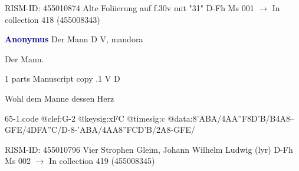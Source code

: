 \documentclass[twocolumn]{book}
\begin{document}
\newline RISM-ID: 455010874
\newline Alte Foliierung auf f.30v mit "31"
\newline D-Fh  Ms 001
\newline $\rightarrow$ In collection 418 (455008343)

\newline \par \vspace{7pt} \textcolor{darkblue}{\textbf{Anonymus  }}
\newline Der Mann  D  
\newline V, mandora
\newline \begin{itshape}[heading, f.58v:] Der Mann.\end{itshape} 
\newline \textcolor{darkblue}{}  1 parts  
\newline Manuscript copy
.1  V  D
\newline \begin{footnotesize} Wohl dem Manne dessen Herz \end{footnotesize}  
\begin{filecontents*}{65-1.code}
@clef:G-2
@keysig:xFC
@timesig:c
@data:8'ABA/4AA''F8D'B/B4A8--GFE/4DFA''C/D-8-'ABA/4AA{8''FC}{D'B}/2A8-GFE/
\end{filecontents*}
\newline
%

\newline RISM-ID: 455010796
\newline Vier Strophen
\newline Gleim, Johann Wilhelm Ludwig  (lyr)
\newline D-Fh  Ms 002
\newline $\rightarrow$ In collection 419 (455008345)
\end{document}
